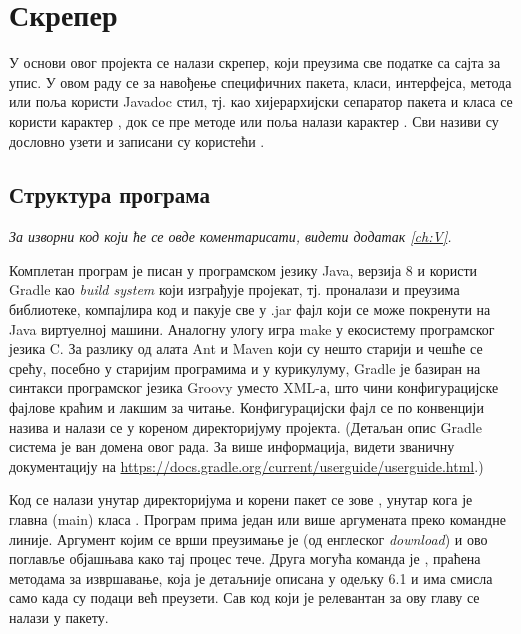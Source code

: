 \chapter{Скрепер}\label{ch:\thechapter}

У основи овог пројекта се налази скрепер, који преузима све податке са сајта за упис. У овом раду се за навођење специфичних пакета, класи, интерфејса, метода или поља користи Javadoc стил, тј. као хијерархијски сепаратор пакета и класа се користи карактер , док се пре методе или поља налази карактер \code{\#}. Сви називи су дословно узети и записани су користећи .



\section{Структура програма}
\vspace*{-7mm}
\emph{За изворни код који ће се овде коментарисати, видети додатак \ref{ch:V}.}

Комплетан програм је писан у програмском језику Java, верзија 8 и користи Gradle као \emph{build system} који изграђује пројекат, тј. проналази и преузима библиотеке, компајлира код и пакује све у .jar фајл који се може покренути на Java виртуелној машини. Аналогну улогу игра make у екосистему програмског језика C. За разлику од алата Ant и Maven који су нешто старији и чешће се срећу, посебно у старијим програмима и у курикулуму, Gradle је базиран на синтакси програмског језика Groovy уместо XML-а, што чини конфигурацијске фајлове краћим и лакшим за читање. Конфигурацијски фајл се по конвенцији назива  и налази се у кореном директоријуму пројекта. (Детаљан опис Gradle система је ван домена овог рада. За више информација, видети званичну документацију на \url{https://docs.gradle.org/current/userguide/userguide.html}.)

Код се налази унутар директоријума  и корени пакет се зове , унутар кога је главна (main) класа . Програм прима један или више аргумената преко командне линије. Аргумент којим се врши преузимање је  (од енглеског \textit{download}) и ово поглавље објашњава како тај процес тече. Друга могућа команда је , праћена методама за извршавање, која је детаљније описана у одељку 6.1 и има смисла само када су подаци већ преузети. Сав код који је релевантан за ову главу се налази у  пакету.



